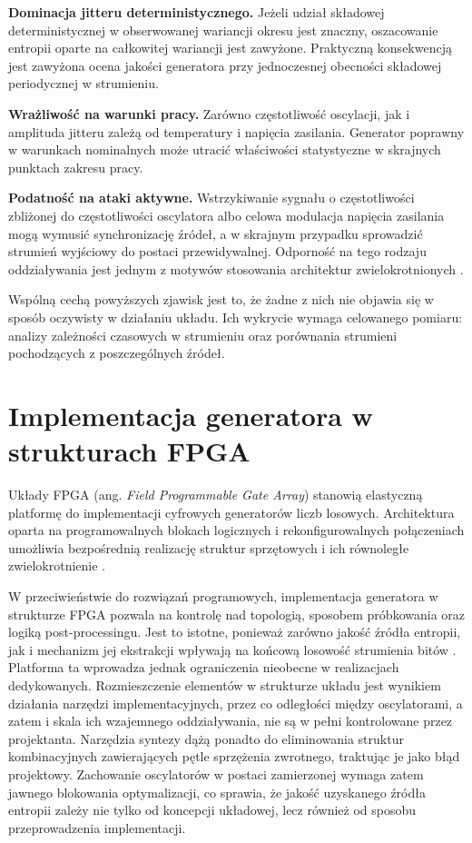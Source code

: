 \textbf{Dominacja jitteru deterministycznego.} Jeżeli udział składowej
deterministycznej w obserwowanej wariancji okresu jest znaczny, oszacowanie
entropii oparte na całkowitej wariancji jest zawyżone. Praktyczną
konsekwencją jest zawyżona ocena jakości generatora przy jednoczesnej
obecności składowej periodycznej w strumieniu.

\textbf{Wrażliwość na warunki pracy.} Zarówno częstotliwość oscylacji, jak
i amplituda jitteru zależą od temperatury i napięcia zasilania. Generator
poprawny w warunkach nominalnych może utracić właściwości statystyczne
w skrajnych punktach zakresu pracy.

\textbf{Podatność na ataki aktywne.} Wstrzykiwanie sygnału o częstotliwości
zbliżonej do częstotliwości oscylatora albo celowa modulacja napięcia
zasilania mogą wymusić synchronizację źródeł, a w skrajnym przypadku
sprowadzić strumień wyjściowy do postaci przewidywalnej. Odporność na tego
rodzaju oddziaływania jest jednym z motywów stosowania architektur
zwielokrotnionych \cite{sunar2006provably}.

Wspólną cechą powyższych zjawisk jest to, że żadne z nich nie objawia się
w sposób oczywisty w działaniu układu. Ich wykrycie wymaga celowanego
pomiaru: analizy zależności czasowych w strumieniu oraz porównania strumieni
pochodzących z poszczególnych źródeł.

\section{Implementacja generatora w strukturach FPGA}

Układy FPGA (ang. \emph{Field Programmable Gate Array}) stanowią
elastyczną platformę do implementacji cyfrowych generatorów liczb
losowych. Architektura oparta na programowalnych blokach logicznych
i rekonfigurowalnych połączeniach umożliwia bezpośrednią realizację
struktur sprzętowych i ich równoległe
zwielokrotnienie \cite{peetermans2019portable}.

W przeciwieństwie do rozwiązań programowych, implementacja generatora
w strukturze FPGA pozwala na kontrolę nad topologią, sposobem próbkowania
oraz logiką post-processingu. Jest to istotne, ponieważ zarówno jakość
źródła entropii, jak i mechanizm jej ekstrakcji wpływają na końcową
losowość strumienia bitów \cite{ma2014entropy}. Platforma ta wprowadza jednak ograniczenia nieobecne w realizacjach
dedykowanych. Rozmieszczenie elementów w strukturze układu jest wynikiem
działania narzędzi implementacyjnych, przez co odległości między
oscylatorami, a zatem i skala ich wzajemnego oddziaływania, nie są w pełni
kontrolowane przez projektanta. Narzędzia syntezy dążą ponadto do
eliminowania struktur kombinacyjnych zawierających pętle sprzężenia
zwrotnego, traktując je jako błąd projektowy. Zachowanie oscylatorów
w postaci zamierzonej wymaga zatem jawnego blokowania optymalizacji, co
sprawia, że jakość uzyskanego źródła entropii zależy nie tylko od koncepcji
układowej, lecz również od sposobu przeprowadzenia implementacji.

